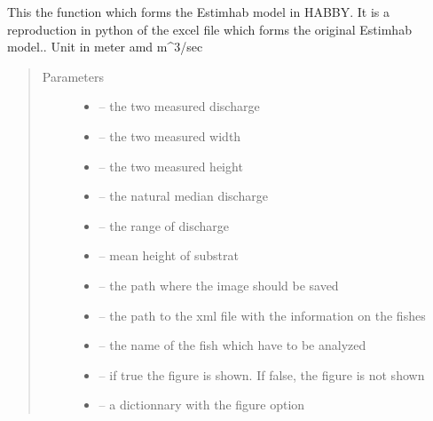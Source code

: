 \documentclass[letterpaper,10pt,english]{sphinxmanual}
\begin{document}
\begin{fulllineitems}
\label{\detokenize{index:src.estimhab.estimhab}}
This the function which forms the Estimhab model in HABBY. It is a reproduction in python of the excel file which
forms the original Estimhab model.. Unit in meter amd m\textasciicircum{}3/sec
\begin{quote}\begin{description}
\item[{Parameters}] \leavevmode\begin{itemize}
\item {} 
 -- the two measured discharge

\item {} 
 -- the two measured width

\item {} 
 -- the two measured height

\item {} 
 -- the natural median discharge

\item {} 
 -- the range of discharge

\item {} 
 -- mean height of substrat

\item {} 
 -- the path where the image should be saved

\item {} 
 -- the path to the xml file with the information on the fishes

\item {} 
 -- the name of the fish which have to be analyzed

\item {} 
 -- if true the figure is shown. If false, the figure is not shown

\item {} 
 -- a dictionnary with the figure option


\end{itemize}
\end{description}
\end{quote}
\end{fulllineitems}
\end{document}
